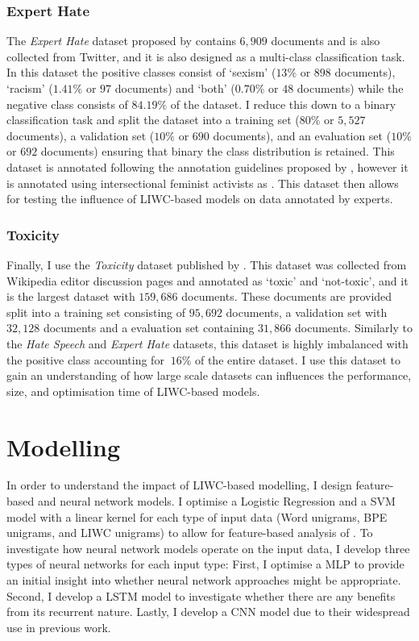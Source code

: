\subsubsection{Expert Hate}
The \textit{Expert Hate} dataset proposed by \citet{Waseem:2016} contains $6,909$ documents and is also collected from Twitter, and it is also designed as a multi-class classification task.
In this dataset the positive classes consist of `sexism' ($13\%$ or $898$ documents), `racism' ($1.41\%$ or $97$ documents) and `both' ($0.70\%$ or $48$ documents) while the negative class consists of $84.19\%$ of the dataset.
I reduce this down to a binary classification task and split the dataset into a training set ($80\%$ or $5,527$ documents), a validation set ($10\%$ or $690$ documents), and an evaluation set ($10\%$ or $692$ documents) ensuring that binary the class distribution is retained.
This dataset is annotated following the annotation guidelines proposed by \citet{Waseem-Hovy:2016}, however it is annotated using intersectional feminist activists as .
This dataset then allows for testing the influence of LIWC-based models on data annotated by experts.

\subsubsection{Toxicity}
Finally, I use the \textit{Toxicity} dataset published by \citet{Wulczyn:2017}.
This dataset was collected from Wikipedia editor discussion pages and annotated as `toxic' and `not-toxic', and it is the largest dataset with $159,686$ documents.
These documents are provided split into a training set consisting of $95,692$ documents, a validation set with $32,128$ documents and a evaluation set containing $31,866$ documents.
Similarly to the \textit{Hate Speech} and \textit{Expert Hate} datasets, this dataset is highly imbalanced with the positive class accounting for $~16\%$ of the entire dataset.
I use this dataset to gain an understanding of how large scale datasets can influences the performance, size, and optimisation time of LIWC-based models.

\section{Modelling}\label{sec:LIWC_modelling}
In order to understand the impact of LIWC-based modelling, I design feature-based and neural network models.
I optimise a Logistic Regression  and a SVM model with a linear kernel for each type of input data (Word unigrams, BPE unigrams, and LIWC unigrams) to allow for feature-based analysis of .
To investigate how neural network models operate on the input data, I develop three types of neural networks for each input type: 
First, I optimise a MLP to provide an initial insight into whether neural network approaches might be appropriate. 
Second, I develop a LSTM model to investigate whether there are any benefits from its recurrent nature.
Lastly, I develop a CNN model due to their widespread use in previous work.

